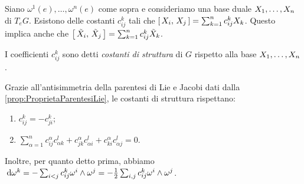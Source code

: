 Siano $\omega^1(e), \ldots, \omega^n(e)$ come sopra e consideriamo una base duale $\seqb Xn,$ di $T_eG$. Esistono delle costanti $c_{ij}^k$ tali che $\comm{X_i}{X_j} = \sum_{k=1}^n c_{ij}^k X_k$. Questo implica anche che $\comm{\tilde X_i}{\tilde X_j} = \sum_{k=1}^n c_{ij}^k \tilde X_k$.

\begin{definition}
	I coefficienti $c_{ij}^k$ sono detti \emph{costanti di struttura} di $G$ rispetto alla base $\seqb Xn,$.
\end{definition}

Grazie all'antisimmetria della parentesi di Lie e Jacobi dati dalla \cref{prop:ProprietaParentesiLie}, le costanti di struttura rispettano:
\begin{enumerate}
	\item $c_{ij}^k = -c_{ji}^k$;
	\item $\sum_{\alpha=1}^n c_{ij}^\alpha c_{\alpha k}^l + c_{jk}^\alpha c_{\alpha i}^l + c_{ki}^\alpha c_{\alpha j}^l = 0$.
\end{enumerate}
Inoltre, per quanto detto prima, abbiamo $\de \omega^k = -\sum_{i<j} c_{ij}^k \omega^i \wedge \omega^j = -\frac 12 \sum_{i,j} c_{ij}^k \omega^i \wedge \omega^j$.


